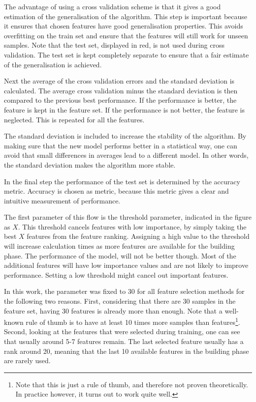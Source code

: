 
The advantage of using a cross validation scheme is that it gives a good estimation of the generalisation of the algorithm. This step is important because it ensures that chosen features have good generalisation properties. This avoids overfitting on the train set and ensure that the features will still work for unseen samples. Note that the test set, displayed in red, is not used during cross validation. The test set is kept completely separate to ensure that a fair estimate of the generalisation is achieved.

\npar

Next the average of the cross validation errors and the standard deviation is calculated. The average cross validation minus the standard deviation is then compared to the previous best performance. If the performance is better, the feature is kept in the feature set. If the performance is not better, the feature is neglected. This is repeated for all the features. 

\npar

The standard deviation is included to increase the stability of the algorithm. By making sure that the new model performs better in a statistical way, one can avoid that small differences in averages lead to a different model. In other words, the standard deviation makes the algorithm more stable.

\npar

In the final step the performance of the test set is determined by the accuracy metric. Accuracy is chosen as metric, because this metric gives a clear and intuitive measurement of performance.

\npar

The first parameter of this flow is the threshold parameter, indicated in the figure as $X$. This threshold cancels features with low importance, by simply taking the best $X$ features from the feature ranking. Assigning a high value to the threshold will increase calculation times as more features are available for the building phase. The performance of the model, will not be better though. Most of the additional features will have low importance values and are not likely to improve performance. Setting a low threshold might cancel out important features. 

\npar

In this work, the parameter was fixed to 30 for all feature selection methods for the following two reasons. First, considering that there are 30 samples in the feature set, having 30 features is already more than enough. Note that a well-known rule of thumb is to have at least 10 times more samples than features\citep{rot1,rot2}\footnote{Note that this is just a rule of thumb, and therefore not proven theoretically. In practice however, it turns out to work quite well.}. Second, looking at the features that were selected during training, one can see that usually around 5-7 features remain. The last selected feature usually has a rank around 20, meaning that the last 10 available features in the building phase are rarely used.

